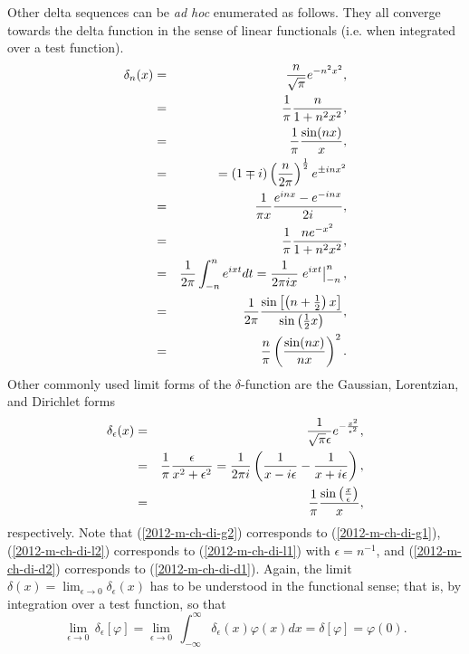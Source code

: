 Other delta sequences can be {\it ad hoc}  enumerated as follows.
They all converge towards the delta function in the sense of linear functionals (i.e. when integrated over a test function).
\begin{eqnarray}
\delta_n(x)
&=& \frac{n}{\sqrt{\pi}} e^{-n^2 x^2},
\label{2012-m-ch-di-g1}\\
&=&
\frac{1}{\pi}\frac{n}{1+ n^2x^2},    \label{2012-m-ch-di-l1} \\
&=&
\frac{1}{\pi}   \frac{\sin (n x)}{ x}, \label{2012-m-ch-di-d1}\\
&=&
= (1\mp i)\left( {n\over 2\pi }\right)^{1\over 2} e^{\pm inx^2}  \\
&=&
\frac{1}{\pi x}  \frac{e^{inx}-e^{-inx}}{2i} ,\\
&=&
\frac{1}{\pi}  \frac{n  e^{-x^2}}{1+n^2x^2} ,\\
&=&
\frac{1}{2\pi } \int_{-n}^n e^{ixt} dt  = \frac{1}{2\pi i x} \left. e^{ixt}\right|_{-n}^n    ,\\
&=&
\frac{1}{2\pi} \frac{\sin \left[\left( n+\frac{1}{2}\right) x \right]  }{\sin \left( \frac{1}{2}x \right)   },\\
&=&
\frac{n}{ \pi}\left(\frac{\sin (nx)}{nx}\right)^2.
\end{eqnarray}
Other commonly used limit forms of the $\delta $-function are the Gaussian, Lorentzian, and Dirichlet forms
\begin{eqnarray}
\delta_\epsilon (x) &=&   \frac{1}{\sqrt{\pi } \epsilon } e^{-\frac{x^2}{\epsilon^2}} ,
\label{2012-m-ch-di-g2} \\
&=&  \frac{1}{\pi} \frac{\epsilon }{x^2+\epsilon^2}
=   {1\over 2\pi i}
\left(
{1 \over x-i\epsilon }
-
{1 \over x+i\epsilon }
 \right)
 , \label{2012-m-ch-di-l2}  \\
&=&  \frac{1}{\pi } \frac{\sin \left(\frac{x}{\epsilon }\right)}{x} ,  \label{2012-m-ch-di-d2}
\end{eqnarray}
respectively.
Note that
(\ref{2012-m-ch-di-g2}) corresponds to (\ref{2012-m-ch-di-g1}),
(\ref{2012-m-ch-di-l2}) corresponds to (\ref{2012-m-ch-di-l1}) with $\epsilon=n^{-1}$,
and
(\ref{2012-m-ch-di-d2}) corresponds to (\ref{2012-m-ch-di-d1}).
Again, the limit
$
\delta (x)= \lim_{\epsilon \rightarrow 0} \delta_\epsilon (x)
$
has to be understood in the functional sense; that is, by integration over a test function,
so that
\begin{equation}
\lim_{\epsilon \rightarrow 0}\, \delta_\epsilon [\varphi]=
\lim_{\epsilon \rightarrow 0}\, \int_{-\infty}^\infty \delta_\epsilon (x) \varphi (x) dx  =    \delta [\varphi]=\varphi (0).
\end{equation}





